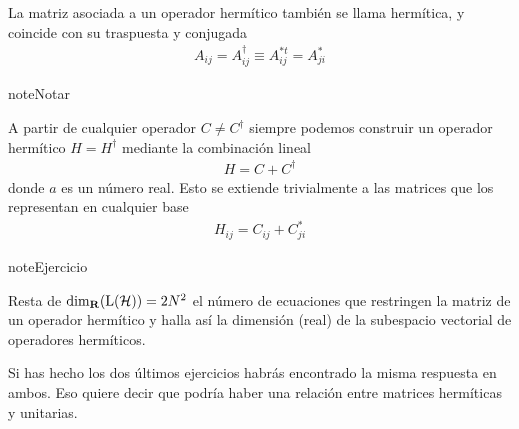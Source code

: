 \documentclass[letterpaper,10pt,english]{jupyterBook}
\newcommand{\Hil}{{\cal H}}
\begin{document}
\sphinxAtStartPar
La matriz asociada a un operador hermítico también se llama hermítica, y coincide con su traspuesta y conjugada
\begin{equation*}
\begin{split}
A_{ij} = A^\dagger_{ij} \equiv  A^{*t}_{ij} = A^*_{ji}   
\end{split}
\end{equation*}
\begin{sphinxadmonition}{note}{Notar}

\sphinxAtStartPar
A partir de cualquier operador \(C\neq C^\dagger \) siempre podemos construir un operador hermítico \(H=H^\dagger\) mediante la combinación lineal
\begin{equation*}
\begin{split}
H = C + C^\dagger
\end{split}
\end{equation*}
\sphinxAtStartPar
donde \(a\) es un número real. Esto se extiende trivialmente a las matrices que los representan en cualquier base
\begin{equation*}
\begin{split}
H_{ij} = C_{ij} + C_{ji}^*
\end{split}
\end{equation*}\end{sphinxadmonition}

\begin{sphinxadmonition}{note}{Ejercicio}

\sphinxAtStartPar
Resta de  \({\rm dim}_{\bf R}({\rm L}(\Hil)) =  2N^2\) el número de ecuaciones que restringen la matriz de un operador
hermítico y halla así la dimensión (real) de la  subespacio vectorial de operadores hermíticos.
\end{sphinxadmonition}

\sphinxAtStartPar
Si has hecho los dos últimos ejercicios  habrás encontrado la misma respuesta en ambos. Eso quiere decir que podría haber una relación entre matrices hermíticas y unitarias.
\end{document}
